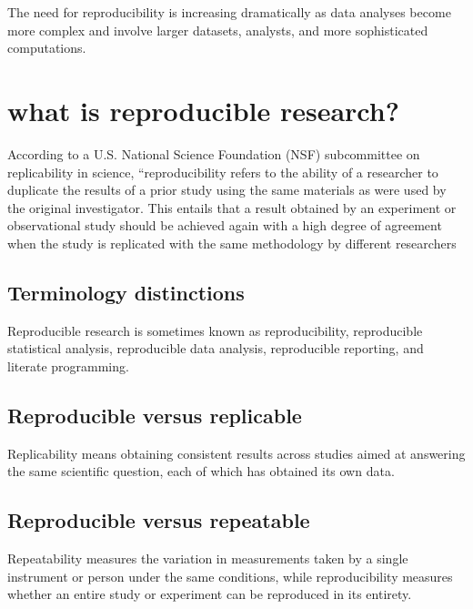 \documentclass[
]{book}
\begin{document}
The need for reproducibility is increasing dramatically as data analyses become more complex and involve larger datasets, analysts, and more sophisticated computations.

\hypertarget{what-is-reproducible-research}{%
\section{what is reproducible research?}\label{what-is-reproducible-research}}

According to a U.S. National Science Foundation (NSF) subcommittee on replicability in science, ``reproducibility refers to the ability of a researcher to duplicate the results of a prior study using the same materials as were used by the original investigator. This entails that a result obtained by an experiment or observational study should be achieved again with a high degree of agreement when the study is replicated with the same methodology by different researchers

\hypertarget{terminology-distinctions}{%
\subsection{Terminology distinctions}\label{terminology-distinctions}}

Reproducible research is sometimes known as reproducibility, reproducible statistical analysis, reproducible data analysis, reproducible reporting, and literate programming.

\hypertarget{reproducible-versus-replicable}{%
\subsection{Reproducible versus replicable}\label{reproducible-versus-replicable}}

Replicability means obtaining consistent results across studies aimed at answering the same scientific question, each of which has obtained its own data.

\hypertarget{reproducible-versus-repeatable}{%
\subsection{Reproducible versus repeatable}\label{reproducible-versus-repeatable}}

Repeatability measures the variation in measurements taken by a single instrument or person under the same conditions, while reproducibility measures whether an entire study or experiment can be reproduced in its entirety.
\end{document}

